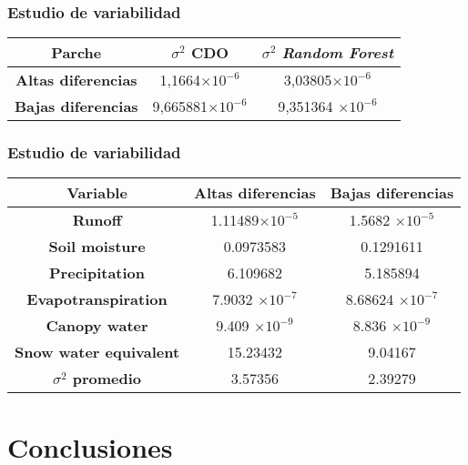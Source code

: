 \documentclass{beamer}
\begin{document}
  \begin{frame}
    \frametitle{Estudio de variabilidad}

    \begin{center}
      \begin{tabular}{|c|c|c|}
        \hline
        \textbf{Parche}	& \textbf{$\sigma^2$ CDO}	& \textbf{$\sigma^2$ \textit{Random Forest}} \\
        \hline
        \textbf{Altas diferencias}		& 1,1664$\times 10^{-6}$ &3,03805$\times 10^{-6}$  \\
        \textbf{Bajas diferencias}		 & 9,665881$\times 10^{-6}$ & 9,351364 $\times 10^{-6}$\\
        \hline
      \end{tabular}
    \end{center}
  \end{frame}

  \begin{frame}
    \frametitle{Estudio de variabilidad}
    \centering
    \begin{tabular}{|c|c|c|}
      \hline
      \textbf{Variable}	& \textbf{Altas diferencias}	& \textbf{Bajas diferencias} \\
      \hline
      \textbf{Runoff}		                 & 1.11489$\times 10^{-5}$    & 1.5682 $\times 10^{-5}$  \\
      \textbf{Soil moisture}		         & 0.0973583                  & 0.1291611\\
      \textbf{Precipitation}		         & 6.109682                   & 5.185894\\
      \textbf{Evapotranspiration}	       & 7.9032 $\times 10^{-7}$    & 8.68624 $\times 10^{-7}$\\
      \textbf{Canopy water}		           & 9.409  $\times 10^{-9}$    & 8.836  $\times 10^{-9}$\\
      \textbf{Snow water equivalent}	   & 15.23432                   & 9.04167 \\
      \hline
      \textbf{$\sigma^2$ promedio}         & 3.57356                    & 2.39279\\
      \hline
    \end{tabular}
  \end{frame}
  \section{Conclusiones}

  \begin{frame}
    \frametitle{}
  \end{frame}
\end{document}
